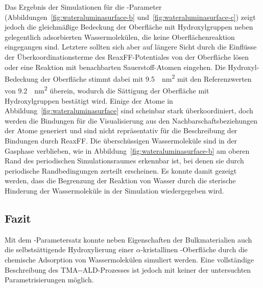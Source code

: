 Das Ergebnis der Simulationen für die -Parameter (Abbildungen~\ref{fig:wateraluminasurface-b} und~\ref{fig:wateraluminasurface-c}) zeigt jedoch die gleichmäßige Bedeckung der Oberfläche mit Hydroxylgruppen neben gelegentlich adsorbierten Wassermolekülen, die keine Oberflächenreaktion eingegangen sind.
Letztere sollten sich aber auf längere Sicht durch die Einflüsse der Überkoordinationsterme des ReaxFF-Potentiales von der Oberfläche lösen oder eine Reaktion mit benachbarten Sauerstoff-Atomen eingehen.
Die Hydroxyl-Bedeckung der Oberfläche stimmt dabei mit \SI{9.5}{\per\square\nano\meter} mit den Referenzwerten von \SI{9.2}{\per\square\nano\meter} überein, wodurch die Sättigung der Oberfläche mit Hydroxylgruppen bestätigt wird.
Einige der Atome in Abbildung~\ref{fig:wateraluminasurface} sind scheinbar stark überkoordiniert, doch werden die Bindungen für die Visualisierung aus den Nachbarschaftsbeziehungen der Atome generiert und sind nicht repräsentativ für die Beschreibung der Bindungen durch ReaxFF.
Die überschüssigen Wassermoleküle sind in der Gasphase verblieben, wie in Abbildung~\ref{fig:wateraluminasurface-b} am oberen Rand des periodischen Simulationsraumes erkennbar ist, bei denen sie durch periodische Randbedingungen zerteilt erscheinen.
Es konnte damit gezeigt werden, dass die Begrenzung der Reaktion von Wasser durch die sterische Hinderung der Wassermoleküle in der Simulation wiedergegeben wird.


\subsection{Fazit}

Mit dem -Parametersatz konnte neben Eigenschaften der Bulkmaterialien auch die selbstsättigende Hydroxylierung einer $\alpha$-kristallinen -Ober\-fläche durch die chemische Adsorption von Wassermolekülen simuliert werden.
Eine vollständige Beschreibung des TMA--ALD-Prozesses ist jedoch mit keiner der untersuchten Parametrisierungen möglich.
